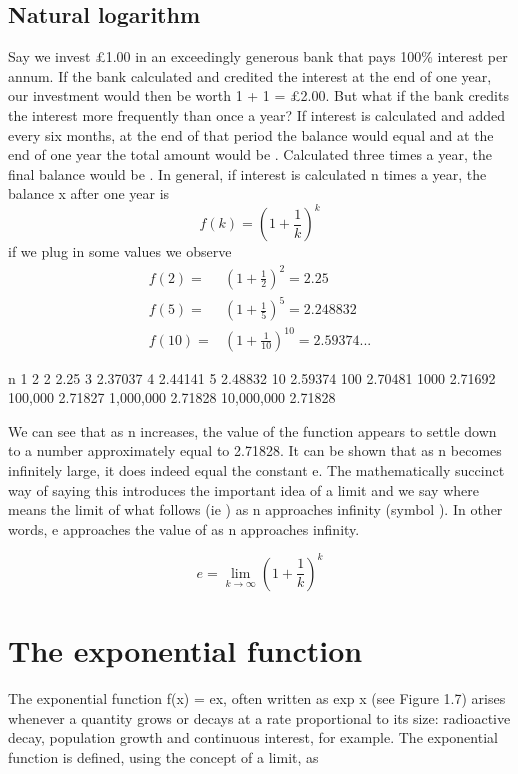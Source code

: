 
\subsection{Natural logarithm}
Say we invest £1.00 in an exceedingly generous bank that pays 100\% interest per annum. If the bank calculated and credited the interest at the end of one year, our investment would then be worth 1 + 1 = £2.00. But what if the bank credits the interest more frequently than once a year? If interest is calculated and added every six months, at the end of that period the balance would equal and at the end of one year the total amount would be . Calculated three times a year, the final balance would be . In general, if interest is calculated n times a year, the balance x after one year is
\[
f(k) = \left(1 + \frac{1}{k}\right)^k
\]
if we plug in some values we observe
\[
\begin{align*}
  f(2)  =& \left(1 + \frac{1}{2}\right)^2 = 2.25 \\
  f(5)  =& \left(1 + \frac{1}{5}\right)^5 = 2.248832 \\
  f(10) =& \left(1 + \frac{1}{10}\right)^{10} = 2.59374...
\end{align*}
\]

n 1 2 2 2.25 3 2.37037 4 2.44141 5 2.48832 10 2.59374 100 2.70481 1000 2.71692 100,000 2.71827 1,000,000 2.71828 10,000,000 2.71828

We can see that as n increases, the value of the function appears to settle down to a number approximately equal to 2.71828. It can be shown that as n becomes infinitely large, it does indeed equal the constant e. The mathematically succinct way of saying this introduces the important idea of a limit and we say where means the limit of what follows (ie ) as n approaches infinity (symbol ). In other words, e approaches the value of as n approaches infinity.

\begin{equation}
e = \lim_{k\to\infty}\left(1 + \frac{1}{k}\right)^k
\end{equation}

\section{The exponential function}
The exponential function f(x) = ex, often written as exp x (see Figure 1.7) arises whenever a quantity grows or decays at a rate proportional to its size: radioactive decay, population growth and continuous interest, for example. The exponential function is defined, using the concept of a limit, as

